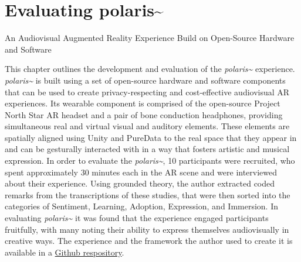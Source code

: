 \chapter{Evaluating polaris\textasciitilde{}}{An Audiovisual Augmented Reality Experience Build on Open-Source Hardware and Software}
\label{sec: polaris}
\epigraph{\emph{}}{}
This chapter outlines the development and evaluation of the \textit{polaris\textasciitilde{}} experience. \textit{polaris\textasciitilde{}} is built using a set of open-source hardware and software components that can be used to create privacy-respecting and cost-effective audiovisual AR experiences. Its wearable component is comprised of the open-source Project North Star AR headset and a pair of bone conduction headphones, providing simultaneous real and virtual visual and auditory elements. These elements are spatially aligned using Unity and PureData to the real space that they appear in and can be gesturally interacted with in a way that fosters artistic and musical expression. In order to evaluate the \textit{polaris\textasciitilde{}}, 10 participants were recruited, who spent approximately 30 minutes each in the AR scene and were interviewed about their experience. Using grounded theory, the author extracted coded remarks from the transcriptions of these studies, that were then sorted into the categories of Sentiment, Learning, Adoption, Expression, and Immersion. In evaluating \textit{polaris\textasciitilde{}} it was found that the experience engaged participants fruitfully, with many noting their ability to express themselves audiovisually in creative ways. The experience and the framework the author used to create it is available in a \href{https://github.com/sambilbow/polaris}{Github respository}.


